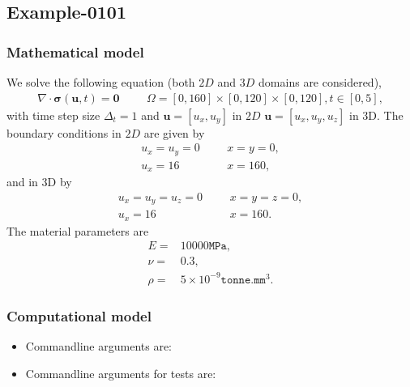 %
\clearpage
%
\subsection{Example-0101}
%
%
\subsubsection{Mathematical model}
%
We solve the following equation (both $2D$ and $3D$ domains are considered),
%
\begin{align}
    \nabla \cdot \boldsymbol{\sigma} (\boldsymbol{u}, t) = \boldsymbol{0} & &&\Omega = [0, 160] \times [0, 120] \times [0, 120], t \in [0, 5],
\end{align}
%
with time step size $\Delta_t = 1$ and $\boldsymbol{u} = [u_x,u_y]$ in $2D$ $\boldsymbol{u} = [u_x,u_y,u_z]$ in 3D. The boundary conditions in $2D$ are given by
%
\begin{align}
    u_x = u_y = 0 & &&x = y = 0, \\
		u_x = 16 & &&x = 160,
\end{align}
%
and in 3D by
\begin{align}
    u_x = u_y = u_z =0 & &&x = y = z =0, \\
		u_x = 16 & &&x = 160.
\end{align}
The material parameters are
\begin{align}
    E = & 10000\texttt{MPa}, \\
    \nu = & 0.3, \\
		\rho = & 5 \times 10^{-9}\texttt{tonne.mm$^3$}.
\end{align}
%
%
\subsubsection{Computational model}
%
\begin{itemize}
    \item{Commandline arguments are:}
    \item{Commandline arguments for tests are:}
        \subitem{\ldots}
\end{itemize}
%
%
